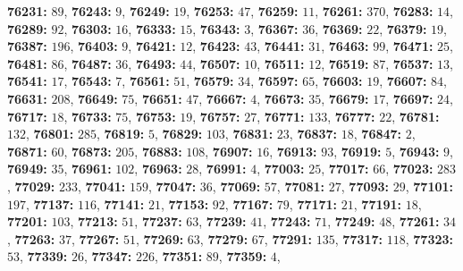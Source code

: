 \textsf{\bfseries 76231:} $89$, \textsf{\bfseries 76243:} $9$, \textsf{\bfseries 76249:} $19$, \textsf{\bfseries 76253:} $47$, \textsf{\bfseries 76259:} $11$, \textsf{\bfseries 76261:} $370$, \textsf{\bfseries 76283:} $14$, \textsf{\bfseries 76289:} $92$, \textsf{\bfseries 76303:} $16$, \textsf{\bfseries 76333:} $15$, \textsf{\bfseries 76343:} $3$, \textsf{\bfseries 76367:} $36$, \textsf{\bfseries 76369:} $22$, \textsf{\bfseries 76379:} $19$, \textsf{\bfseries 76387:} $196$, \textsf{\bfseries 76403:} $9$, \textsf{\bfseries 76421:} $12$, \textsf{\bfseries 76423:} $43$, \textsf{\bfseries 76441:} $31$, \textsf{\bfseries 76463:} $99$, \textsf{\bfseries 76471:} $25$, \textsf{\bfseries 76481:} $86$, \textsf{\bfseries 76487:} $36$, \textsf{\bfseries 76493:} $44$, \textsf{\bfseries 76507:} $10$, \textsf{\bfseries 76511:} $12$, \textsf{\bfseries 76519:} $87$, \textsf{\bfseries 76537:} $13$, \textsf{\bfseries 76541:} $17$, \textsf{\bfseries 76543:} $7$, \textsf{\bfseries 76561:} $51$, \textsf{\bfseries 76579:} $34$, \textsf{\bfseries 76597:} $65$, \textsf{\bfseries 76603:} $19$, \textsf{\bfseries 76607:} $84$, \textsf{\bfseries 76631:} $208$, \textsf{\bfseries 76649:} $75$, \textsf{\bfseries 76651:} $47$, \textsf{\bfseries 76667:} $4$, \textsf{\bfseries 76673:} $35$, \textsf{\bfseries 76679:} $17$, \textsf{\bfseries 76697:} $24$, \textsf{\bfseries 76717:} $18$, \textsf{\bfseries 76733:} $75$, \textsf{\bfseries 76753:} $19$, \textsf{\bfseries 76757:} $27$, \textsf{\bfseries 76771:} $133$, \textsf{\bfseries 76777:} $22$, \textsf{\bfseries 76781:} $132$, \textsf{\bfseries 76801:} $285$, \textsf{\bfseries 76819:} $5$, \textsf{\bfseries 76829:} $103$, \textsf{\bfseries 76831:} $23$, \textsf{\bfseries 76837:} $18$, \textsf{\bfseries 76847:} $2$, \textsf{\bfseries 76871:} $60$, \textsf{\bfseries 76873:} $205$, \textsf{\bfseries 76883:} $108$, \textsf{\bfseries 76907:} $16$, \textsf{\bfseries 76913:} $93$, \textsf{\bfseries 76919:} $5$, \textsf{\bfseries 76943:} $9$, \textsf{\bfseries 76949:} $35$, \textsf{\bfseries 76961:} $102$, \textsf{\bfseries 76963:} $28$, \textsf{\bfseries 76991:} $4$, \textsf{\bfseries 77003:} $25$, \textsf{\bfseries 77017:} $66$, \textsf{\bfseries 77023:} $283$, \textsf{\bfseries 77029:} $233$, \textsf{\bfseries 77041:} $159$, \textsf{\bfseries 77047:} $36$, \textsf{\bfseries 77069:} $57$, \textsf{\bfseries 77081:} $27$, \textsf{\bfseries 77093:} $29$, \textsf{\bfseries 77101:} $197$, \textsf{\bfseries 77137:} $116$, \textsf{\bfseries 77141:} $21$, \textsf{\bfseries 77153:} $92$, \textsf{\bfseries 77167:} $79$, \textsf{\bfseries 77171:} $21$, \textsf{\bfseries 77191:} $18$, \textsf{\bfseries 77201:} $103$, \textsf{\bfseries 77213:} $51$, \textsf{\bfseries 77237:} $63$, \textsf{\bfseries 77239:} $41$, \textsf{\bfseries 77243:} $71$, \textsf{\bfseries 77249:} $48$, \textsf{\bfseries 77261:} $34$, \textsf{\bfseries 77263:} $37$, \textsf{\bfseries 77267:} $51$, \textsf{\bfseries 77269:} $63$, \textsf{\bfseries 77279:} $67$, \textsf{\bfseries 77291:} $135$, \textsf{\bfseries 77317:} $118$, \textsf{\bfseries 77323:} $53$, \textsf{\bfseries 77339:} $26$, \textsf{\bfseries 77347:} $226$, \textsf{\bfseries 77351:} $89$, \textsf{\bfseries 77359:} $4$, 
